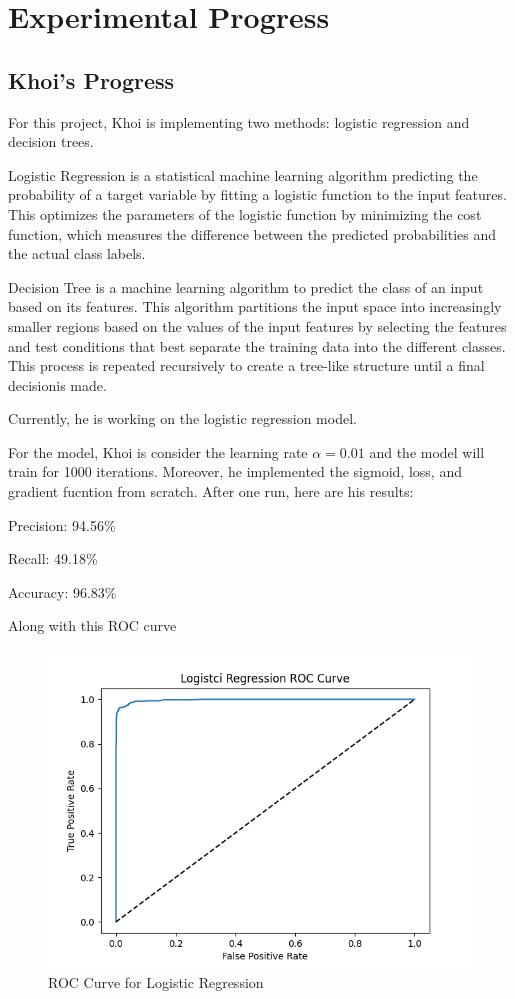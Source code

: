 \section{Experimental Progress}

\subsection{Khoi's Progress}

For this project, Khoi is implementing two methods: logistic regression and decision trees.

Logistic Regression is a statistical machine learning algorithm predicting the probability of a target variable by fitting a logistic function to the input features. This optimizes the parameters of the logistic function by minimizing the cost function, which measures the difference between the predicted probabilities and the actual class labels.

Decision Tree is a machine learning algorithm to predict the class of an input based on its features. This algorithm partitions the input space into increasingly smaller regions based on the values of the input features by selecting the features and test conditions that best separate the training data into the different classes. This process is repeated recursively to create a tree-like structure until a final decisionis made.

Currently, he is working on the logistic regression model.

For the model, Khoi is consider the learning rate $\alpha = 0.01$ and the model will train for 1000 iterations. Moreover, he implemented the sigmoid, loss, and gradient fucntion from scratch. After one run, here are his results:

Precision: 94.56\%

Recall: 49.18\%

Accuracy: 96.83\%

Along with this ROC curve

\begin{figure}[H] %
    \centering
    \includegraphics[width=1\linewidth]{LogisticROC.png}
    \caption{ROC Curve for Logistic Regression}
\end{figure}

